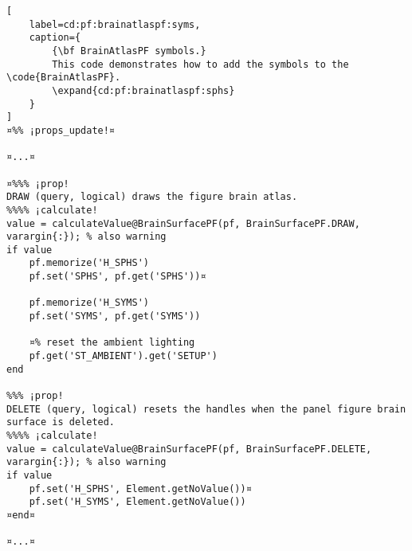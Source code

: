 \documentclass{tufte-handout}
\begin{document}
\begin{lstlisting}[
	label=cd:pf:brainatlaspf:syms,
	caption={
		{\bf BrainAtlasPF symbols.}
		This code demonstrates how to add the symbols to the \code{BrainAtlasPF}.
		\expand{cd:pf:brainatlaspf:sphs}
	}
]
¤%% ¡props_update!¤

¤...¤

¤%%% ¡prop!
DRAW (query, logical) draws the figure brain atlas.
%%%% ¡calculate!
value = calculateValue@BrainSurfacePF(pf, BrainSurfacePF.DRAW, varargin{:}); % also warning
if value
    pf.memorize('H_SPHS')
    pf.set('SPHS', pf.get('SPHS'))¤
    
    pf.memorize('H_SYMS')
    pf.set('SYMS', pf.get('SYMS'))

    ¤% reset the ambient lighting
    pf.get('ST_AMBIENT').get('SETUP')
end

%%% ¡prop!
DELETE (query, logical) resets the handles when the panel figure brain surface is deleted.
%%%% ¡calculate!
value = calculateValue@BrainSurfacePF(pf, BrainSurfacePF.DELETE, varargin{:}); % also warning
if value
    pf.set('H_SPHS', Element.getNoValue())¤
    pf.set('H_SYMS', Element.getNoValue())
¤end¤

¤...¤
\end{lstlisting}
\end{document}
